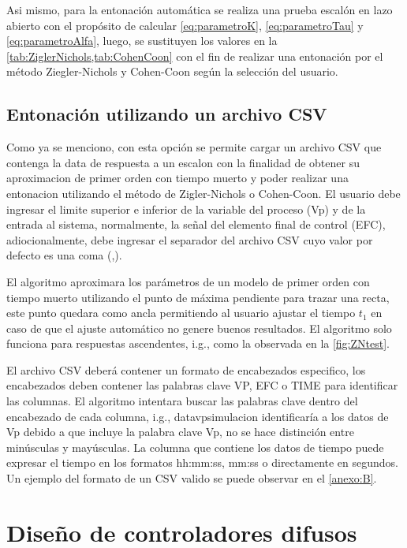         Asi mismo, para la entonación automática se realiza una prueba escalón en lazo abierto con el propósito de calcular \cref{eq:parametroK}, \cref{eq:parametroTau} y \cref{eq:parametroAlfa}, luego, se sustituyen los valores en la \cref{tab:ZiglerNichols,tab:CohenCoon} con el fin de realizar una entonación por el método Ziegler-Nichols y Cohen-Coon según la selección del usuario.

    \subsection{Entonación utilizando un archivo CSV}

        Como ya se menciono, con esta opción se permite cargar un archivo CSV que contenga la data de respuesta a un escalon con la finalidad de obtener su aproximacion de primer orden con tiempo muerto y poder realizar una entonacion utilizando el método de Zigler-Nichols o Cohen-Coon. El usuario debe ingresar el limite superior e inferior de la variable del proceso (Vp) y de la entrada al sistema, normalmente, la señal del elemento final de control (EFC), adiocionalmente, debe ingresar el separador del archivo CSV cuyo valor por defecto es una coma (,).

        El algoritmo aproximara los parámetros de un modelo de primer orden con tiempo muerto utilizando el punto de máxima pendiente para trazar una recta, este punto quedara como ancla permitiendo al usuario ajustar el tiempo $t_1$ en caso de que el ajuste automático no genere buenos resultados. El algoritmo solo funciona para respuestas ascendentes, i.g., como la observada en la \cref{fig:ZNtest}.

        El archivo CSV deberá contener un formato de encabezados especifico, los encabezados deben contener las palabras clave VP, EFC o TIME para identificar las columnas. El algoritmo intentara buscar las palabras clave dentro del encabezado de cada columna, i.g., datavpsimulacion identificaría a los datos de Vp debido a que incluye la palabra clave Vp, no se hace distinción entre minúsculas y mayúsculas. La columna que contiene los datos de tiempo puede expresar el tiempo en los formatos hh:mm:ss, mm:ss o directamente en segundos. Un ejemplo del formato de un CSV valido se puede observar en el \ref{anexo:B}.

\section{Diseño de controladores difusos}
    
